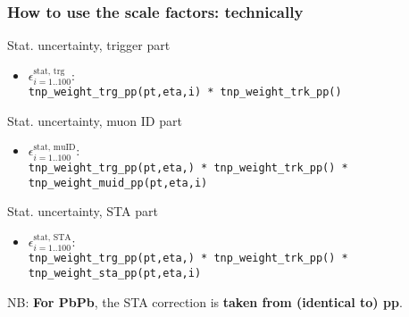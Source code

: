 \documentclass[9pt]{beamer}
\begin{document}
 \begin{frame}[plain]
  \frametitle{How to use the scale factors: technically}
  
  \begin{block}{Stat. uncertainty, trigger part}
  \begin{itemize}
   \item \alert{$\epsilon^\text{stat, trg}_{i=1..100}$}: \\\texttt{tnp\_weight\_trg\_pp(pt,eta,\alert{i}) * tnp\_weight\_trk\_pp()}
   \end{itemize}
  \end{block}
  
  \begin{block}{Stat. uncertainty, muon ID part}
  \begin{itemize}
   \item \alert{$\epsilon^\text{stat, muID}_{i=1..100}$}: \\\texttt{tnp\_weight\_trg\_pp(pt,eta,) * tnp\_weight\_trk\_pp() * tnp\_weight\_\alert{muid}\_pp(pt,eta,\alert{i})}
   \end{itemize}
  \end{block}
  
  \begin{block}{Stat. uncertainty, STA part}
  \begin{itemize}
   \item \alert{$\epsilon^\text{stat, STA}_{i=1..100}$}: \\\texttt{tnp\_weight\_trg\_pp(pt,eta,) * tnp\_weight\_trk\_pp() * tnp\_weight\_\alert{sta}\_pp(pt,eta,\alert{i})}
   \end{itemize}
   
   \footnotesize \alert{NB}: \textbf{For PbPb}, the STA correction is \textbf{taken from (identical to) pp}.
  \end{block}

 \end{frame}
 
\end{document}
